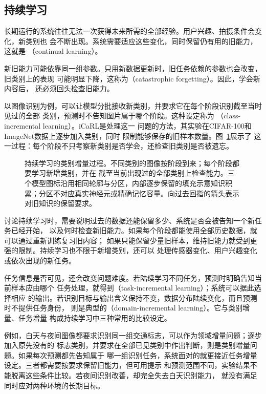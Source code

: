 \subsection{持续学习}
\label{sec:continual-learning}

长期运行的系统往往无法一次获得未来所需的全部经验。用户兴趣、拍摄条件会变化，新类别也
会不断出现。系统需要适应这些变化，同时保留仍有用的旧能力，这就是
（continual learning）。

新旧能力可能依靠同一组参数。只用新数据更新时，旧任务依赖的参数也会改变，旧类别上的表现
可能明显下降，这称为（catastrophic forgetting）。因此，学会新内容后，
还必须回头检查旧能力。

以图像识别为例，可以让模型分批接收新类别，并要求它在每个阶段识别截至当时见过的全部
类别，预测时不告知图片属于哪个阶段。这种设定称为
（class-incremental learning）。iCaRL是处理这一
问题的方法，其实验在CIFAR-100和ImageNet数据上逐步加入类别，同时
限制能够保存的旧样本数量。图~\ref{fig:continual-learning-timeline}展示了
这一过程：每个阶段不只考察新类别是否学会，还检查旧类别是否被遗忘。

\begin{figure}[!htb]
  \centering
  \caption{持续学习的类别增量过程。不同类别的图像按阶段到来；每个阶段都要学习新增类别，并在
  截至当前出现过的全部类别上检查能力。三个模型图标沿用相同轮廓与分区，内部逐步保留的填充示意知识积累；分区不对应真实神经元或精确记忆容量。向过去回指的箭头表示对旧知识的保留要求。}
  \label{fig:continual-learning-timeline}
\end{figure}
\FloatBarrier

讨论持续学习时，需要说明过去的数据还能保留多少、系统是否会被告知一个新任务已经开始，
以及何时检查新旧能力。如果每个阶段都能使用全部历史数据，就可以通过重新训练复习旧内容；
如果只能保留少量旧样本，维持旧能力就受到更强的限制。持续学习也不限于新增类别，还可以
处理传感器变化、用户兴趣变化或依次出现的新任务。

任务信息是否可见，还会改变问题难度。若陆续学习不同任务，预测时明确告知当前样本应由哪个
任务处理，就得到（task-incremental learning）；系统可以据此选择相应
的输出。若识别目标与输出含义保持不变，数据分布陆续变化，而且预测时不提供任务身份，
则是典型的（domain-incremental learning）。它与类别增量、任务增量
构成持续学习中三种常用的比较设定。

例如，白天与夜间图像都要求识别同一组交通标志，可以作为领域增量问题；逐步加入原先没有的
标志类别，并要求在全部已见类别中作出判断，则是类别增量问题。如果每次预测都先告知属于
哪一组识别任务，系统面对的就更接近任务增量设定。三者都需要按要求保留旧能力，但可用提示
和预测范围不同，实验结果不能脱离这些条件比较。若夜间识别改善，却完全失去白天识别能力，
就没有满足同时应对两种环境的长期目标。

